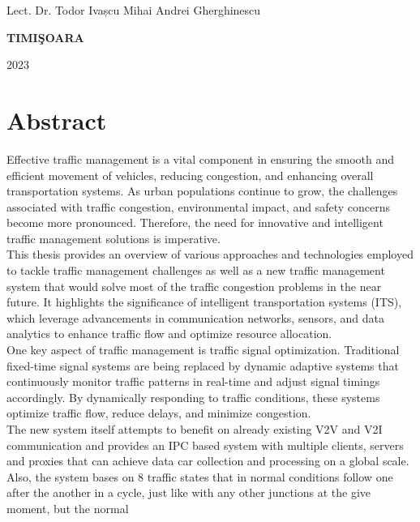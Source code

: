\documentclass[17pt]{report}
\begin{document}
{\large{}

\noindent Lect. Dr. Todor Ivașcu \hfill 
\noindent Mihai Andrei Gherghinescu
}



\vfill
\begin{center}
{\bf TIMI\c SOARA

2023}
\end{center}

\newpage
\normalsize{}

\section*{Abstract}
\indent \indent
Effective traffic management is a vital component in ensuring
the smooth and efficient movement of vehicles, reducing congestion,
and enhancing overall transportation systems. As urban populations
continue to grow, the challenges associated with traffic congestion,
environmental impact, and safety concerns become more pronounced.
Therefore, the need for innovative and intelligent traffic management
solutions is imperative.\\
\indent
This thesis provides an overview of various approaches and
technologies employed to tackle traffic management challenges as 
well as a new traffic management system that would solve most of 
the traffic congestion problems in the near future. It highlights
the significance of intelligent transportation systems (ITS),
which leverage advancements in communication networks, sensors,
and data analytics to enhance traffic flow and optimize resource
allocation.\\
\indent
One key aspect of traffic management is traffic signal optimization.
Traditional fixed-time signal systems are being replaced by dynamic
adaptive systems that continuously monitor traffic patterns in
real-time and adjust signal timings accordingly. By dynamically
responding to traffic conditions, these systems optimize traffic flow,
reduce delays, and minimize congestion.\\
\indent
The new system itself attempts to benefit on already existing V2V and 
V2I communication and provides an IPC based system with multiple 
clients, servers and proxies that can achieve data car collection and processing
on a global scale. Also, the system bases on 8 traffic states that 
in normal conditions follow one after the another in a cycle, just like
with any other junctions at the give moment, but the normal 
\end{document}
